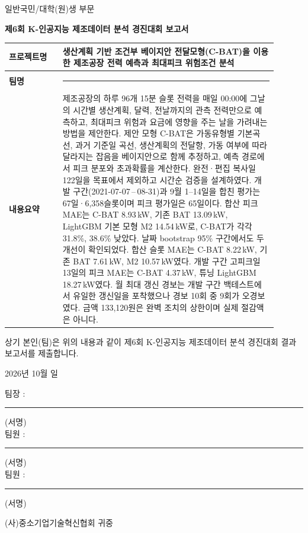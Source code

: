 \hypersetup{pageanchor=false}
\begin{titlepage}
\centering
{\large 일반국민/대학(원)생 부문}\par\vspace{4mm}
{\Large\bfseries 제6회 K-인공지능 제조데이터 분석 경진대회 보고서}\par\vspace{12mm}
\renewcommand{\arraystretch}{1.6}
\begin{tabular}{|p{0.18\linewidth}|p{0.72\linewidth}|}
\hline
\textbf{프로젝트명} & 생산계획 기반 조건부 베이지안 전달모형(C-BAT)을 이용한 제조공장 전력 예측과 최대피크 위험조건 분석 \\
\hline
\textbf{팀명} & \rule{5cm}{0.4pt} \\
\hline
\textbf{내용요약} &
\small 제조공장의 하루 96개 15분 슬롯 전력을 매일 00:00에 그날의 시간별 생산계획, 달력, 전날까지의 관측 전력만으로 예측하고, 최대피크 위험과 요금에 영향을 주는 날을 가려내는 방법을 제안한다.
제안 모형 C-BAT은 가동유형별 기본곡선, 과거 기준일 곡선, 생산계획의 전달항, 가동 여부에 따라 달라지는 잡음을 베이지안으로 함께 추정하고, 예측 경로에서 피크 분포와 초과확률을 계산한다.
완전·편집 복사일 122일을 목표에서 제외하고 시간순 검증을 설계하였다.
개발 구간(2021-07-07\,--\,08-31)과 9월 1--14일을 합친 평가는 67일·6,358슬롯이며 피크 평가일은 65일이다.
합산 피크 MAE는 C-BAT 8.93\,kW, 기존 BAT 13.09\,kW, LightGBM 기본 모형 M2 14.54\,kW로, C-BAT가 각각 31.8\%, 38.6\% 낮았다. 날짜 bootstrap 95\% 구간에서도 두 개선이 확인되었다.
합산 슬롯 MAE는 C-BAT 8.22\,kW, 기존 BAT 7.61\,kW, M2 10.57\,kW였다. 개발 구간 고피크일 13일의 피크 MAE는 C-BAT 4.37\,kW, 튜닝 LightGBM 18.27\,kW였다.
월 최대 갱신 경보는 개발 구간 백테스트에서 유일한 갱신일을 포착했으나 경보 10회 중 9회가 오경보였다. 금액 133,120원은 완벽 조치의 상한이며 실제 절감액은 아니다. \\
\hline
\end{tabular}
\vfill
\begin{flushleft}
\small 상기 본인(팀)은 위의 내용과 같이 제6회 K-인공지능 제조데이터 분석 경진대회 결과 보고서를 제출합니다.
\end{flushleft}
\vspace{6mm}
{2026년 \quad 10월 \quad\quad 일}\par\vspace{8mm}
\begin{flushright}
팀장 : \rule{3.5cm}{0.4pt} (서명)\\[3mm]
팀원 : \rule{3.5cm}{0.4pt} (서명)\\[3mm]
팀원 : \rule{3.5cm}{0.4pt} (서명)
\end{flushright}
\vspace{10mm}
{\large (사)중소기업기술혁신협회 귀중}
\end{titlepage}
\hypersetup{pageanchor=true}


